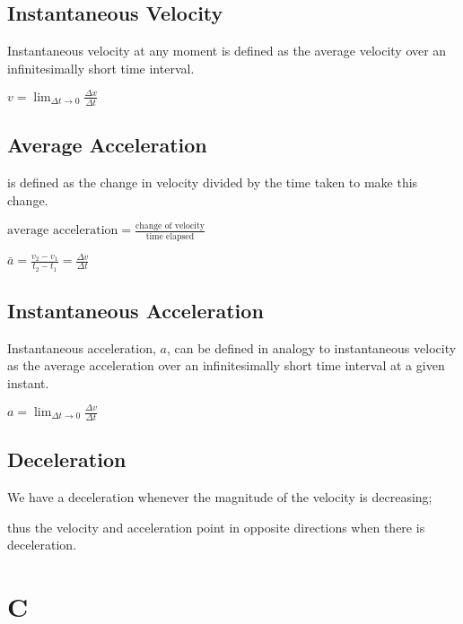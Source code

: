 \documentclass{extarticle}
\begin{document}
\begin{tcolorbox}[enhanced jigsaw,sharp corners,coltext=black,colback=BurntOrange!25!white,boxrule=0pt,breakable,size=minimal]
\subsection{Instantaneous Velocity}
Instantaneous velocity at any moment is defined as the average velocity over an infinitesimally short time interval.

$v = \lim_{\Delta t \to 0} \frac{\Delta x}{\Delta t}$

\subsection{Average Acceleration}
is defined as the change in velocity divided by the time taken to make this change.

$\text{average acceleration} = \frac{\text{change of velocity}}{\text{time elapsed}}$

$\bar{a} = \frac{v_2 - v_1}{t_2 - t_1} = \frac{\Delta v}{\Delta t}$

\subsection{Instantaneous Acceleration}
Instantaneous acceleration, $a$, can be defined in analogy to instantaneous
velocity as the average acceleration over an infinitesimally short time interval at
a given instant.

$a = \lim_{\Delta t \to 0} \frac{\Delta v}{\Delta t}$


\subsection{Deceleration}
We have a deceleration whenever the magnitude of the velocity is decreasing;

thus the velocity and acceleration point in opposite directions when there is deceleration.
















\end{tcolorbox}



\section{C}
\end{document}
